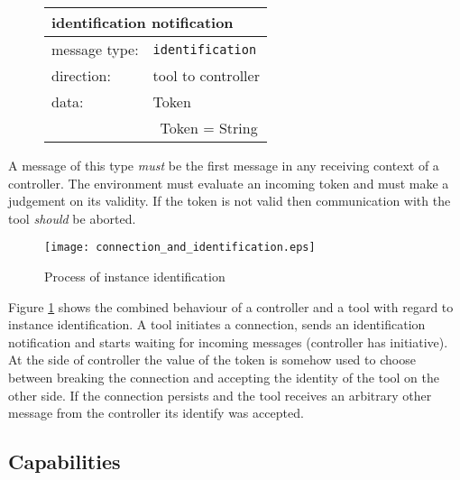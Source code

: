 \documentclass{article}
\newcommand{\msg}[1]{\texttt{#1}}
\begin{document}
   \begin{figure}[H]
    \begin{center}
     \begin{tabular}{|ll|}
      \hline
       \multicolumn{2}{|l|}{\textbf{identification notification}} \\
      \hline
       message type:    & \msg{identification} \\
      \hline
       direction:       & tool to controller \\
       data:            & Token \\
                        & \ Token = String \\
      \hline
     \end{tabular}
     \vspace{-0.3cm}
    \end{center}
   \end{figure}

   \noindent A message of this type \emph{must} be the first message in any
   receiving context of a controller. The environment must evaluate an incoming
   token and must make a judgement on its validity. If the token is not valid
   then communication with the tool \emph{should} be aborted.

   \begin{figure}[H]
    \begin{center}
     \texttt{[image: connection\_and\_identification.eps]}
    \end{center}
    \vspace{-0.3cm}
    \caption{Process of instance identification}
    \label{fig::identification}
   \end{figure}

   \noindent Figure \ref{fig::identification} shows the combined behaviour of a
   controller and a tool with regard to instance identification. A tool
   initiates a connection, sends an identification notification and starts
   waiting for incoming messages (controller has initiative).  At the side of
   controller the value of the token is somehow used to choose between breaking
   the connection and accepting the identity of the tool on the other side. If
   the connection persists and the tool receives an arbitrary other message
   from the controller its identify was accepted.

  \subsection{Capabilities}
\end{document}
